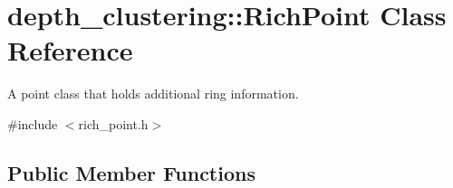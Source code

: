 \hypertarget{classdepth__clustering_1_1RichPoint}{\section{depth\-\_\-clustering\-:\-:Rich\-Point Class Reference}
\label{classdepth__clustering_1_1RichPoint}
}


A point class that holds additional ring information.  




{\ttfamily \#include $<$rich\-\_\-point.\-h$>$}

\subsection*{Public Member Functions}
